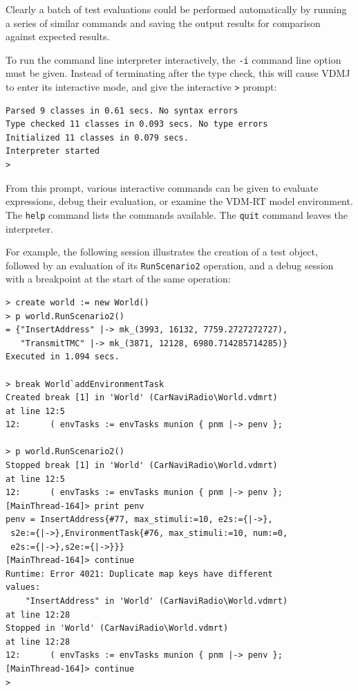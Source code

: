 Clearly a batch of test evaluations could be performed automatically by running
a series of similar commands and saving the output results for comparison
against expected results.

To run the command line interpreter interactively, the \verb|-i| command line
option must be given. Instead of terminating after the type check, this will
cause VDMJ to enter its interactive mode, and give the interactive \verb|>|
prompt:

\begin{lstlisting}
Parsed 9 classes in 0.61 secs. No syntax errors
Type checked 11 classes in 0.093 secs. No type errors
Initialized 11 classes in 0.079 secs. 
Interpreter started
>
\end{lstlisting}

\noindent From this prompt, various interactive commands can be given to
evaluate expressions, debug their evaluation, or examine the VDM-RT model environment.
The \verb|help| command lists the commands available. The \verb|quit| command
leaves the interpreter.

For example, the following session illustrates the creation of a test object,
followed by an evaluation of its \verb|RunScenario2| operation, and a debug
session with a breakpoint at the start of the same operation:

\begin{lstlisting}
> create world := new World()
> p world.RunScenario2()
= {"InsertAddress" |-> mk_(3993, 16132, 7759.2727272727),
   "TransmitTMC" |-> mk_(3871, 12128, 6980.714285714285)}
Executed in 1.094 secs.

> break World`addEnvironmentTask
Created break [1] in 'World' (CarNaviRadio\World.vdmrt) 
at line 12:5
12:      ( envTasks := envTasks munion { pnm |-> penv };

> p world.RunScenario2()
Stopped break [1] in 'World' (CarNaviRadio\World.vdmrt) 
at line 12:5
12:      ( envTasks := envTasks munion { pnm |-> penv };
[MainThread-164]> print penv
penv = InsertAddress{#77, max_stimuli:=10, e2s:={|->},
 s2e:={|->},EnvironmentTask{#76, max_stimuli:=10, num:=0,
 e2s:={|->},s2e:={|->}}}
[MainThread-164]> continue
Runtime: Error 4021: Duplicate map keys have different 
values:
    "InsertAddress" in 'World' (CarNaviRadio\World.vdmrt) 
at line 12:28
Stopped in 'World' (CarNaviRadio\World.vdmrt) 
at line 12:28
12:      ( envTasks := envTasks munion { pnm |-> penv };
[MainThread-164]> continue
> \end{lstlisting}

